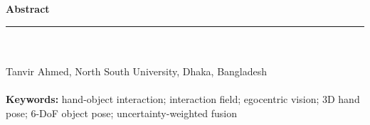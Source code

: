 \documentclass[11pt]{article}
\begin{document}
{\large\bfseries Abstract}\\[2mm]
\rule{\textwidth}{0.4pt}\\[3mm]
{\bfseries \PaperTitle}\\[2mm]
Tanvir Ahmed, North South University, Dhaka, Bangladesh\\[5mm]

\\[5mm]
{\bfseries Keywords:} hand-object interaction; interaction field; egocentric vision; 3D hand pose;
6-DoF object pose; uncertainty-weighted fusion
\end{document}
